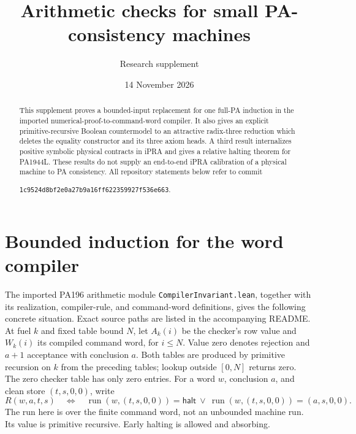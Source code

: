 \documentclass[11pt]{article}
\title{Arithmetic checks for small PA-consistency machines}
\author{Research supplement}
\date{14 November 2026}
\begin{document}
\maketitle
\begin{abstract}
This supplement proves a bounded-input replacement for one full-PA induction
in the imported numerical-proof-to-command-word compiler. It also gives an
explicit primitive-recursive Boolean countermodel to an attractive radix-three
reduction which deletes the equality constructor and its three axiom heads.
A third result internalizes positive symbolic physical contracts in iPRA and
gives a relative halting theorem for PA1944L. These results do not supply an
end-to-end iPRA calibration of a physical machine to PA consistency.
All repository statements below refer to commit
\begin{center}\texttt{1c9524d8bf2e0a27b9a16ff622359927f536e663}.\end{center}
\end{abstract}

\section{Bounded induction for the word compiler}

The imported PA196 arithmetic module \texttt{CompilerInvariant.lean},
together with its realization, compiler-rule, and command-word definitions,
gives the following concrete situation. Exact source paths are listed in
the accompanying README.
At fuel $k$ and fixed table bound $N$, let $A_k(i)$ be the checker's row
value and $W_k(i)$ its compiled command word, for $i\le N$.
Value zero denotes rejection and $a+1$ acceptance with conclusion $a$.
Both tables are produced by primitive recursion on $k$ from the preceding
tables; lookup outside $[0,N]$ returns zero. The zero checker table has only
zero entries. For a word $w$, conclusion $a$, and clean store $(t,s,0,0)$,
write
\[
 R(w,a,t,s)\quad\Longleftrightarrow\quad
 \operatorname{run}(w,(t,s,0,0))=\mathsf{halt}
 \ \lor\
 \operatorname{run}(w,(t,s,0,0))=(a,s,0,0).
\]
The run here is over the finite command word, not an unbounded machine run.
Its value is primitive recursive. Early halting is allowed and absorbing.
\end{document}
